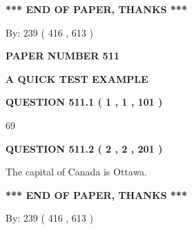 \documentclass[12pt]{article}
\begin{document}
\vspace{1.0in} 
{\textbf{\large{ *** END OF PAPER, THANKS *** }}} 
   
   
\hspace{1.0in} By: 
 239 ( 416 ,  613 )
   
   
   
   
\newpage 
\setcounter{page}{ 
   511001 } 
   
   
   
   
 {\textbf{ \Large{ PAPER NUMBER  511  }}}
   
   
\vspace{0.2in}
   
   
   
   
   
   
 \vspace{0.2in}
{\LARGE {\textbf{ A QUICK TEST EXAMPLE}}}
   
   
  
\vspace{0.2in}
  
{\textbf{\Large{QUESTION
511.1 
 ( 1 , 1 , 101 )
}}}
  
  
 
 
\noindent{}

69
 
 
  
\vspace{0.2in}
  
{\textbf{\Large{QUESTION
511.2 
 ( 2 , 2 , 201 )
}}}
  
  
 
 
\noindent{}
 
 
The capital of Canada is Ottawa.
 
 
 
 
   
   
 \vspace{0.2in}
 
   
   
   
   
\vspace{1.0in} 
{\textbf{\large{ *** END OF PAPER, THANKS *** }}} 
   
   
\hspace{1.0in} By: 
 239 ( 416 ,  613 )
   
\end{document}
